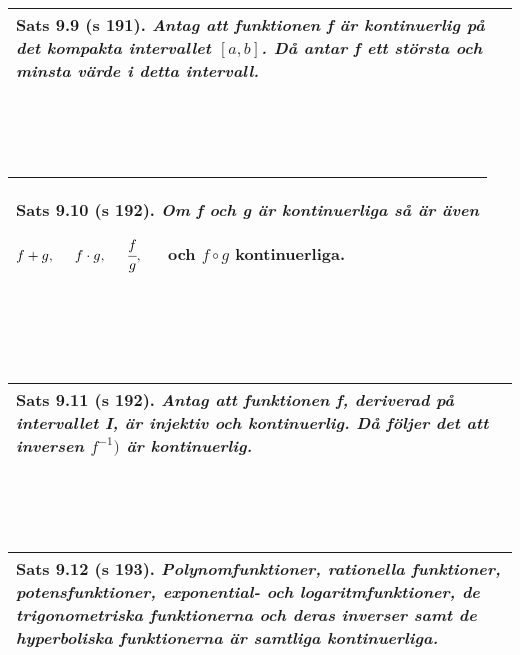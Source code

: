 \documentclass[a4paper]{article}
\begin{document}
\\\\\\
\begin{tabular}{|L{11.5cm}|} \hline
\textbf{Sats 9.9} (s 191). 
\textit{Antag att funktionen f är kontinuerlig på det kompakta intervallet $[a,b]$. Då antar f ett största och minsta värde i detta intervall.}
\\\hline
\end{tabular}
\\\\\\
\begin{tabular}{|L{11.5cm}|} \hline
\textbf{Sats 9.10} (s 192). 
\textit{Om f och g är kontinuerliga så är även}
\begin{center}
$f+g, \hspace{0.5cm} f \cdot g, \hspace{0.5cm} \cfrac{f}{g}, \hspace{0.5cm}$ och \hspace{0.5cm} $f \circ g$ \hspace{0.5cm} kontinuerliga.
\end{center}
\\\hline
\end{tabular}
\\\\\\
\begin{tabular}{|L{11.5cm}|} \hline
\textbf{Sats 9.11} (s 192). 
\textit{Antag att funktionen f, deriverad på intervallet \textbf{I}, är injektiv och kontinuerlig. Då följer det att inversen $f^{-1})$ är kontinuerlig.}
\\\hline
\end{tabular}
\\\\\\
\begin{tabular}{|L{11.5cm}|} \hline
\textbf{Sats 9.12} (s 193). 
\textit{Polynomfunktioner, rationella funktioner, potensfunktioner, exponential- och logaritmfunktioner, de trigonometriska funktionerna och deras inverser samt de hyperboliska funktionerna är samtliga kontinuerliga.}
\\\hline
\end{tabular}
\\\\\\
\end{document}
